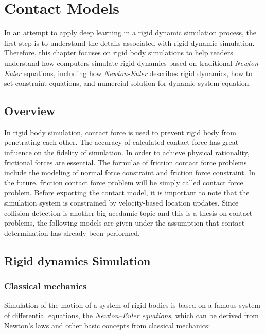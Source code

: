 
\chapter{Contact Models}

In an attempt to apply deep learning in a rigid dynamic simulation process, the first step is to understand the details associated with rigid dynamic simulation. Therefore, this chapter focuses on rigid body simulations to help readers understand how computers simulate rigid dynamics based on traditional \textit {Newton-Euler} equations, including how \textit {Newton-Euler} describes rigid dynamics, how to set constraint equations, and numercial solution for dynamic system equation.

\section{Overview}

In rigid body simulation, contact force is used to prevent rigid body from penetrating each other. The accuracy of calculated contact force has great influence on the fidelity of simulation. In order to achieve physical rationality, frictional forces are essential. The formulae of friction contact force problems include the modeling of normal force constraint and friction force constraint. In the future, friction contact force problem will be simply called contact force problem. Before exporting the contact model, it is important to note that the simulation system is constrained by velocity-based location updates\cite{Erleben:2007:VSP:1243980.1243986}. Since collision detection is another big acedamic topic\cite{boulic2007collision} and this is a thesis on contact problems, the following models are given under the assumption that contact determination has already been performed.

\section{Rigid dynamics Simulation}

\subsection{Classical mechanics}
Simulation of the motion of a system of rigid bodies is based on a famous system of differential equations, the \textit{Newton–Euler equations}, which can be derived from Newton’s laws and other basic concepts from classical mechanics:

